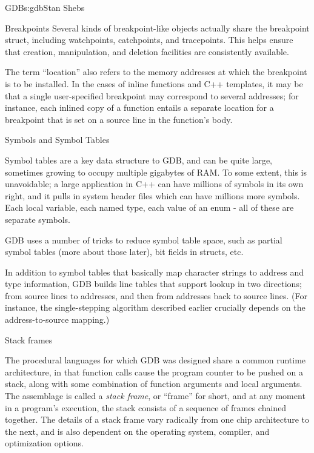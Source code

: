 \begin{aosachapter}{GDB}{s:gdb}{Stan Shebs}
\begin{aosasect2}{Breakpoints}
Several kinds of breakpoint-like objects actually share the breakpoint
struct, including watchpoints, catchpoints, and tracepoints.  This
helps ensure that creation, manipulation, and deletion facilities are
consistently available.

The term ``location'' also refers to the memory addresses at which the
breakpoint is to be installed.  In the cases of inline functions and
C++ templates, it may be that a single user-specified breakpoint may
correspond to several addresses; for instance, each inlined copy of a
function entails a separate location for a breakpoint that is set on a
source line in the function's body.

\end{aosasect2}

\begin{aosasect2}{Symbols and Symbol Tables}

Symbol tables are a key data structure to GDB, and can be quite large,
sometimes growing to occupy multiple gigabytes of RAM.  To some
extent, this is unavoidable; a large application in C++ can have
millions of symbols in its own right, and it pulls in system header
files which can have millions more symbols.  Each local variable, each
named type, each value of an enum - all of these are separate symbols.

GDB uses a number of tricks to reduce symbol table space, such as
partial symbol tables (more about those later), bit fields in structs,
etc.

In addition to symbol tables that basically map character strings to
address and type information, GDB builds line tables that support
lookup in two directions; from source lines to addresses, and then
from addresses back to source lines.  (For instance, the
single-stepping algorithm described earlier crucially depends on the
address-to-source mapping.)

\end{aosasect2}

\begin{aosasect2}{Stack frames}

The procedural languages for which GDB was designed share a common
runtime architecture, in that function calls cause the program counter
to be pushed on a stack, along with some combination of function
arguments and local arguments.  The assemblage is called a {\em stack
  frame}, or ``frame'' for short, and at any moment in a program's
execution, the stack consists of a sequence of frames chained
together.  The details of a stack frame vary radically from one chip
architecture to the next, and is also dependent on the operating
system, compiler, and optimization options.


\end{aosasect2}
\end{aosachapter}
